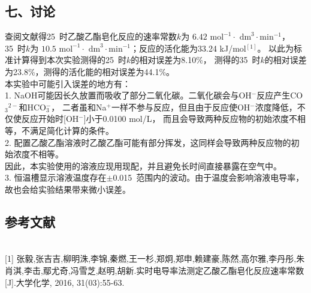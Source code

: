\documentclass[a4paper]{ctexart}
\begin{document}
	\subsection*{七、讨论}
	查阅文献得25~\textcelsius 时乙酸乙酯皂化反应的速率常数$k$为
	$6.42\text{ mol}^{-1}\cdot \text{ dm}^3\cdot \text{min}^{-1}$，35~\textcelsius 时$k$为
	$10.5\text{ mol}^{-1}\cdot \text{ dm}^3\cdot \text{min}^{-1}$；反应的活化能为33.24 kJ/mol$^{[1]}$。
	以此为标准计算得到本次实验测得的25~\textcelsius 时$k$的相对误差为8.10\%，
	测得的35~\textcelsius 时$k$的相对误差为23.8\%，测得的活化能的相对误差为44.1\%。\\[6pt]
	本实验中可能引入误差的地方有：\\[6pt]
	1. NaOH可能因长久放置而吸收了部分二氧化碳。二氧化碳会与OH$^-$反应产生CO$_3{^{2-}}$和HCO$_3^-$，
	二者虽和Na$^+$一样不参与反应，但且由于反应使OH$^-$浓度降低，不仅使反应开始时[OH$^-$]小于0.0100 mol/L，
	而且会导致两种反应物的初始浓度不相等，不满足简化计算的条件。\\[6pt]
	2. 配置乙酸乙酯溶液时乙酸乙酯可能有部分挥发，这同样会导致两种反应物的初始浓度不相等。\\[6pt]
	因此，本实验使用的溶液应现用现配，并且避免长时间直接暴露在空气中。\\[6pt]
	3. 恒温槽显示溶液温度存在$\pm$0.015~\textcelsius 范围内的波动。由于温度会影响溶液电导率，
	故也会给实验结果带来微小误差。\\
	
	
	
	
	\subsection*{参考文献}
	\ \\[0pt]
	[1] 张毅,张吉吉,柳明洙,李锦,秦燃,王一杉,郑炯,郑申,赖建豪,陈然,高尔雅,李丹彤,朱肖淇,李击,鄢尤奇,冯雪芝,赵明,胡新.实时电导率法测定乙酸乙酯皂化反应速率常数[J].大学化学, 2016, 31(03):55-63.
	
\end{document}
